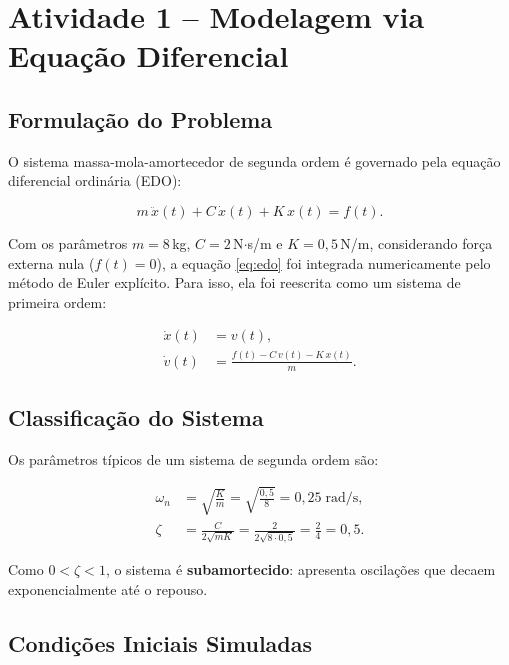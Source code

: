 \documentclass[12pt,a4paper]{article}
\begin{document}
\section{Atividade 1 -- Modelagem via Equação Diferencial}

\subsection{Formulação do Problema}

O sistema massa-mola-amortecedor de segunda ordem é governado pela equação diferencial ordinária (EDO):

\begin{equation}
  m\,\ddot{x}(t) + C\,\dot{x}(t) + K\,x(t) = f(t).
  \label{eq:edo}
\end{equation}

Com os parâmetros $m = 8$\,kg, $C = 2$\,N$\cdot$s/m e $K = 0{,}5$\,N/m, considerando força externa nula ($f(t)=0$), a equação \eqref{eq:edo} foi integrada numericamente pelo método de Euler explícito. Para isso, ela foi reescrita como um sistema de primeira ordem:

\begin{align}
  \dot{x}(t) &= v(t), \label{eq:estado1}\\
  \dot{v}(t) &= \frac{f(t) - C\,v(t) - K\,x(t)}{m}. \label{eq:estado2}
\end{align}

\subsection{Classificação do Sistema}

Os parâmetros típicos de um sistema de segunda ordem são:

\begin{align}
  \omega_n &= \sqrt{\frac{K}{m}} = \sqrt{\frac{0{,}5}{8}} = 0{,}25\;\text{rad/s},
  \label{eq:wn}\\
  \zeta &= \frac{C}{2\sqrt{mK}} = \frac{2}{2\sqrt{8\cdot 0{,}5}}
        = \frac{2}{4} = 0{,}5.
  \label{eq:zeta}
\end{align}

Como $0 < \zeta < 1$, o sistema é \textbf{subamortecido}: apresenta oscilações que decaem exponencialmente até o repouso.

\subsection{Condições Iniciais Simuladas}
\end{document}
